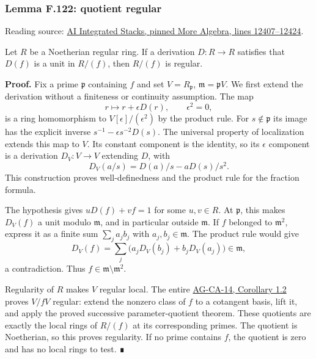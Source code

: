 \documentclass[11pt,a4paper,openany]{report}
\begin{document}
\label{AG-RG-S05-more-algebra-lemma-quotient-regular}

\subsubsection{Lemma F.122: quotient regular}\label{AG-RG-S05-lemma-f.122-quotient-regular}

Reading source: \href{https://github.com/KokunoYumeto/unofficial-stacks-project-ai-drafts/blob/565b10e987aba5969b21145a0833f42d69f96790/more-algebra.tex\#L12407-L12424}{AI Integrated Stacks, pinned More Algebra, lines 12407--12424}.

Let \(R\) be a Noetherian regular ring. If a derivation \(D:R\to R\) satisfies that \(D(f)\) is a unit in \(R/(f)\), then \(R/(f)\) is regular.

\textbf{Proof.} Fix a prime \(\mathfrak p\) containing \(f\) and set \(V=R_{\mathfrak p}\), \(\mathfrak m=\mathfrak pV\). We first extend the derivation without a finiteness or continuity assumption. The map \[r\longmapsto r+\epsilon D(r),\qquad \epsilon^2=0,\] is a ring homomorphism to \(V[\epsilon]/(\epsilon^2)\) by the product rule. For \(s\notin\mathfrak p\) its image has the explicit inverse \(s^{-1}-\epsilon s^{-2}D(s)\). The universal property of localization extends this map to \(V\). Its constant component is the identity, so its \(\epsilon\) component is a derivation \(D_V:V\to V\) extending \(D\), with \[D_V(a/s)=D(a)/s-aD(s)/s^2.\] This construction proves well-definedness and the product rule for the fraction formula.

The hypothesis gives \(uD(f)+vf=1\) for some \(u,v\in R\). At \(\mathfrak p\), this makes \(D_V(f)\) a unit modulo \(\mathfrak m\), and in particular outside \(\mathfrak m\). If \(f\) belonged to \(\mathfrak m^2\), express it as a finite sum \(\sum_j a_jb_j\) with \(a_j,b_j\in\mathfrak m\). The product rule would give \[D_V(f)=\sum_j\bigl(a_jD_V(b_j)+b_jD_V(a_j)\bigr)\in\mathfrak m,\] a contradiction. Thus \(f\in\mathfrak m\setminus\mathfrak m^2\).

Regularity of \(R\) makes \(V\) regular local. The entire \href{https://github.com/KokunoYumeto/open-math-courses/blob/d02d0a3669f42579db037cd44de1d113fdd770a1/docs/courses/AG-CA/src/regular-local-rings.md}{AG-CA-14, Corollary 1.2} proves \(V/fV\) regular: extend the nonzero class of \(f\) to a cotangent basis, lift it, and apply the proved successive parameter-quotient theorem. These quotients are exactly the local rings of \(R/(f)\) at its corresponding primes. The quotient is Noetherian, so this proves regularity. If no prime contains \(f\), the quotient is zero and has no local rings to test. ∎
\end{document}
